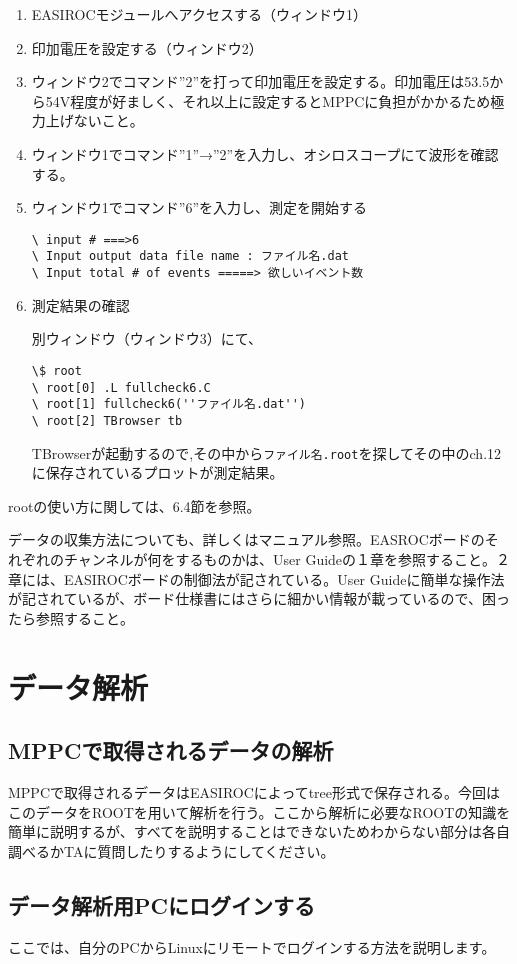 \documentclass[10pt,a4j]{jarticle}
\begin{document}
\begin{enumerate}
\item EASIROCモジュールへアクセスする（ウィンドウ1）
\item 印加電圧を設定する（ウィンドウ2）
\item ウィンドウ2でコマンド''2''を打って印加電圧を設定する。印加電圧は53.5から54V程度が好ましく、それ以上に設定するとMPPCに負担がかかるため極力上げないこと。
\item ウィンドウ1でコマンド''1''→''2''を入力し、オシロスコープにて波形を確認する。
\item ウィンドウ1でコマンド''6''を入力し、測定を開始する\par
\begin{lstlisting}[caption=測定手順]
\ input # ===>6
\ Input output data file name : ファイル名.dat
\ Input total # of events =====> 欲しいイベント数
\end{lstlisting}
\item 測定結果の確認\par
  別ウィンドウ（ウィンドウ3）にて、
\begin{lstlisting}[caption=測定結果の確認]
\$ root
\ root[0] .L fullcheck6.C
\ root[1] fullcheck6(''ファイル名.dat'')
\ root[2] TBrowser tb
\end{lstlisting}
TBrowserが起動するので,その中から{\tt ファイル名.root}を探してその中のch.12に保存されているプロットが測定結果。
\end{enumerate}
rootの使い方に関しては、6.4節を参照。\par
データの収集方法についても、詳しくはマニュアル参照。EASROCボードのそれぞれのチャンネルが何をするものかは、User Guideの１章を参照すること。２章には、EASIROCボードの制御法が記されている。User Guideに簡単な操作法が記されているが、ボード仕様書にはさらに細かい情報が載っているので、困ったら参照すること。
\section{データ解析}
\subsection{MPPCで取得されるデータの解析}
MPPCで取得されるデータはEASIROCによってtree形式で保存される。今回はこのデータをROOTを用いて解析を行う。ここから解析に必要なROOTの知識を簡単に説明するが、すべてを説明することはできないためわからない部分は各自調べるかTAに質問したりするようにしてください。

\subsection{データ解析用PCにログインする}
ここでは、自分のPCからLinuxにリモートでログインする方法を説明します。
\end{document}
